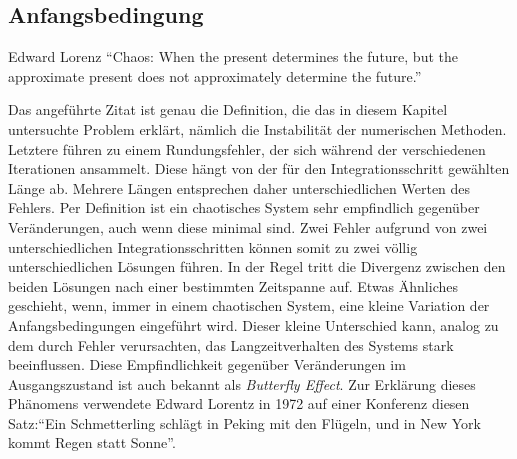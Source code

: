 \subsection{Anfangsbedingung}
\label{vanderpol:subsection:anfangsbedingung}
\begin{cquote}[30pt]{Edward Lorenz}
``Chaos: When the present determines the future, but the approximate present does not approximately determine the future.''
\end{cquote}
\noindent Das angeführte Zitat ist genau die Definition, die das in diesem Kapitel untersuchte Problem erklärt, nämlich die Instabilität der numerischen Methoden. Letztere führen zu einem Rundungsfehler, der sich während der verschiedenen Iterationen ansammelt. Diese hängt von der für den Integrationsschritt gewählten Länge ab. Mehrere Längen entsprechen daher unterschiedlichen Werten des Fehlers. Per Definition ist ein chaotisches System sehr empfindlich gegenüber Veränderungen, auch wenn diese minimal sind. Zwei Fehler aufgrund von zwei unterschiedlichen Integrationsschritten können somit zu zwei völlig unterschiedlichen Lösungen führen. In der Regel tritt die Divergenz zwischen den beiden Lösungen nach einer bestimmten Zeitspanne auf. Etwas Ähnliches geschieht, wenn, immer in einem chaotischen System, eine kleine Variation der Anfangsbedingungen eingeführt wird. Dieser kleine Unterschied kann, analog zu dem durch Fehler verursachten, das Langzeitverhalten des Systems stark beeinflussen. Diese Empfindlichkeit gegenüber Veränderungen im Ausgangszustand ist auch bekannt als {\em Butterfly Effect}. Zur Erklärung dieses Phänomens verwendete Edward Lorentz in 1972 auf einer Konferenz diesen Satz:``Ein Schmetterling schlägt in Peking mit den Flügeln, und in New York kommt Regen statt Sonne''.
